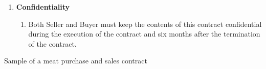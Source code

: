 \begin{table}
{\begin{minipage}{0.8\textwidth}
\begin{enumerate}
                \item \textbf{Confidentiality}
                \begin{enumerate}
                    \item Both Seller and Buyer must keep the contents of this contract conﬁdential during the execution of the contract and six months after the termination of the contract.
                \end{enumerate}
            \end{enumerate}
        \end{minipage}
    }
    \caption{Sample of a meat purchase and sales contract}
    \label{tab:meat}
\end{table}


